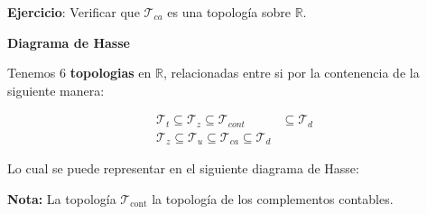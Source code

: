 \textbf{Ejercicio}: Verificar que $\mathcal{T}_{ca}$ es una topología sobre $\mathbb{R}$.

\textbf{Diagrama de Hasse}

Tenemos 6 \textbf{topologias} en \( \mathbb{R} \), relacionadas entre si por la contenencia de la siguiente manera:

\begin{align*}
    \mathscr{T}_t \subseteq \mathscr{T}_z \subseteq \mathscr{T}_{cont} & \subseteq \mathscr{T}_d \\
    \mathscr{T}_z \subseteq \mathscr{T}_u \subseteq \mathscr{T}_{ca} \subseteq \mathscr{T}_d
\end{align*}

Lo cual se puede representar en el siguiente diagrama de Hasse:

\begin{center}
\shorthandoff{>}
\shorthandon{>}
\end{center}

\textbf{Nota:} La topología $\mathscr{T}_{\text{cont}}$ la topología de los complementos contables.